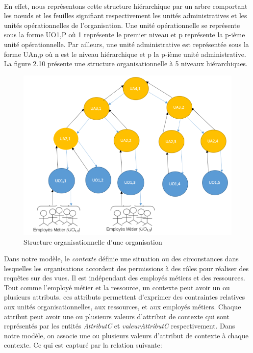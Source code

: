 \paragraph{} En effet, nous représentons cette structure hiérarchique par un arbre comportant les nœuds et les feuilles signifiant respectivement les unités administratives et les unités opérationnelles de l'organisation. Une unité opérationnelle se représente sous la forme UO1,P où 1 représente le premier niveau et p représente la p-ième unité opérationnelle. Par ailleurs, une unité administrative est représentée sous la forme UAn,p où n est le niveau hiérarchique et p la p-ième unité administrative. La figure 2.10 présente une structure organisationnelle à 5 niveaux hiérarchiques.

\begin{figure}[h!]
    \centering
		\includegraphics[scale=0.7]{chap3/images/structureorg.png}
    \caption{Structure organisationnelle d'une organisation}
	 \label{figstructure}
\end{figure} 

\label{sectionContexte}

Dans notre modèle, le \textit{contexte} définie une situation ou des circonstances dans lesquelles les organisations accordent des permissions à des rôles pour réaliser des requêtes sur des vues. Il est indépendant des employés métiers et des ressources. Tout comme l'employé métier et la ressource, un contexte peut avoir un ou plusieurs attributs. ces attributs permettent d'exprimer des contraintes relatives aux unités organisationnelles, aux ressources, et aux employés métiers. Chaque attribut peut avoir une ou plusieurs valeurs d'attribut de contexte qui sont représentés par les entités \textit{AttributC} et \textit{valeurAttributC} respectivement. Dans notre modèle, on associe une ou plusieurs valeurs d'attribut de contexte à chaque contexte. Ce qui est capturé par la relation suivante:

